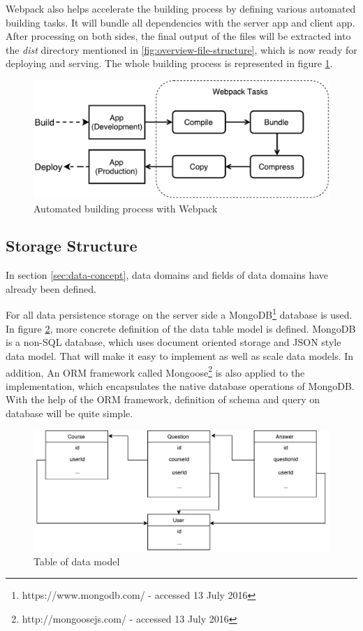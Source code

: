 Webpack also helps accelerate the building process by defining various automated building tasks. It will bundle all dependencies with the server app and client app. After processing on both sides, the final output of the files will be extracted into the \textit{dist} directory mentioned in \ref{fig:overview-file-structure}, which is now ready for deploying and serving. The whole building process is represented in figure \ref{fig:automated-building-imp}.

\begin{figure}[!htbp]
  \centering
    \includegraphics[width=1\textwidth]{Figures/imp-automated-building.pdf}
  \caption{Automated building process with Webpack}
  \label{fig:automated-building-imp}
\end{figure}

\subsection{Storage Structure} \label{subsec:storage-structure-imp}
In section \ref{sec:data-concept}, data domains and fields of data domains  have already been defined. 

For all data persistence storage on the server side a MongoDB\footnote{https://www.mongodb.com/ - accessed 13 July 2016} database is used.  In figure \ref{fig:data-model-table-imp}, more concrete definition of the data table model is defined. MongoDB is a non-SQL database, which uses document oriented storage and JSON style data model. That will make it easy to implement as well as scale data models. In addition, An \gls{ORM} framework called Mongoose\footnote{http://mongoosejs.com/ - accessed 13 July 2016} is also applied to the implementation, which encapsulates the native database operations of MongoDB. With the help of the \gls{ORM} framework, definition of schema and query on database will be quite simple. 


\begin{figure}[!htbp]
  \centering
    \includegraphics[width=1\textwidth]{Figures/concept-data-domain-relation.pdf}
  \caption{Table of data model}
  \label{fig:data-model-table-imp}
\end{figure}
